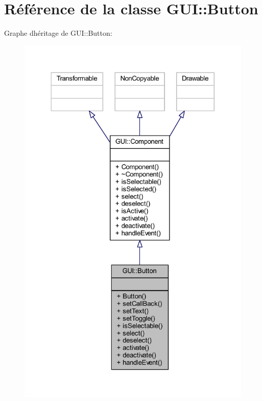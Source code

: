 \hypertarget{class_g_u_i_1_1_button}{}\section{Référence de la classe G\+UI\+:\+:Button}
\label{class_g_u_i_1_1_button}


Graphe d\textquotesingle{}héritage de G\+UI\+:\+:Button\+:\nopagebreak
\begin{figure}[H]
\begin{center}
\leavevmode
\includegraphics[width=324pt]{class_g_u_i_1_1_button__inherit__graph}
\end{center}
\end{figure}


